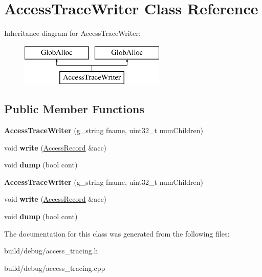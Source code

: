 \hypertarget{classAccessTraceWriter}{\section{Access\-Trace\-Writer Class Reference}
\label{classAccessTraceWriter}
}
Inheritance diagram for Access\-Trace\-Writer\-:\begin{figure}[H]
\begin{center}
\leavevmode
\includegraphics[height=2.000000cm]{classAccessTraceWriter}
\end{center}
\end{figure}
\subsection*{Public Member Functions}
\begin{DoxyCompactItemize}
\item 
\hypertarget{classAccessTraceWriter_a3568333a53ecf4ec44662e0672f8be82}{{\bfseries Access\-Trace\-Writer} (g\-\_\-string fname, uint32\-\_\-t num\-Children)}\label{classAccessTraceWriter_a3568333a53ecf4ec44662e0672f8be82}

\item 
\hypertarget{classAccessTraceWriter_a969899467ba61480b908533ca4c5b8e9}{void {\bfseries write} (\hyperlink{structAccessRecord}{Access\-Record} \&acc)}\label{classAccessTraceWriter_a969899467ba61480b908533ca4c5b8e9}

\item 
\hypertarget{classAccessTraceWriter_a8cfa74417b866f32240f174df5ce6805}{void {\bfseries dump} (bool cont)}\label{classAccessTraceWriter_a8cfa74417b866f32240f174df5ce6805}

\item 
\hypertarget{classAccessTraceWriter_a3568333a53ecf4ec44662e0672f8be82}{{\bfseries Access\-Trace\-Writer} (g\-\_\-string fname, uint32\-\_\-t num\-Children)}\label{classAccessTraceWriter_a3568333a53ecf4ec44662e0672f8be82}

\item 
\hypertarget{classAccessTraceWriter_a969899467ba61480b908533ca4c5b8e9}{void {\bfseries write} (\hyperlink{structAccessRecord}{Access\-Record} \&acc)}\label{classAccessTraceWriter_a969899467ba61480b908533ca4c5b8e9}

\item 
\hypertarget{classAccessTraceWriter_a8cfa74417b866f32240f174df5ce6805}{void {\bfseries dump} (bool cont)}\label{classAccessTraceWriter_a8cfa74417b866f32240f174df5ce6805}

\end{DoxyCompactItemize}


The documentation for this class was generated from the following files\-:\begin{DoxyCompactItemize}
\item 
build/debug/access\-\_\-tracing.\-h\item 
build/debug/access\-\_\-tracing.\-cpp\end{DoxyCompactItemize}
